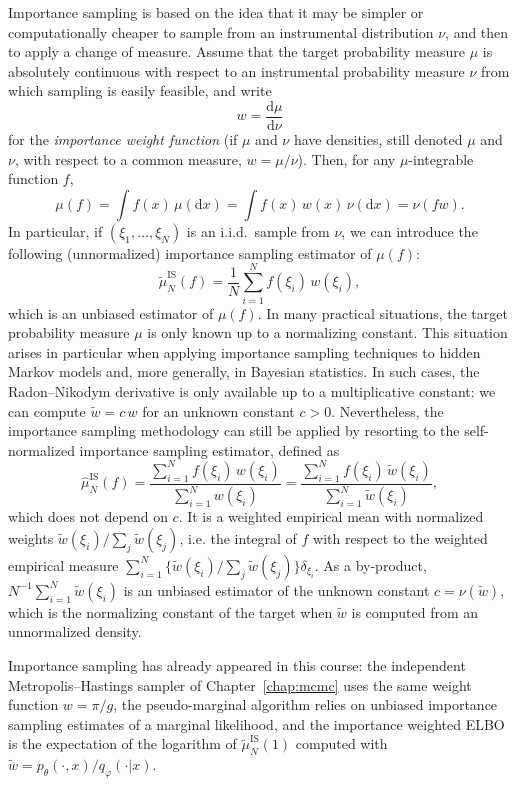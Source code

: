 \documentclass[english,graybox,envcountchap,envcountsame,sectrefs,shortlabels]{svmono}
\theoremstyle{style}
\newcommand{\eqsp}{}
\begin{document}
Importance sampling is based on the idea that it may be simpler or computationally cheaper to sample from an instrumental distribution $\nu$, and then to apply a change of measure. Assume that the target
probability measure $\mu$ is absolutely continuous with respect to an instrumental
probability measure $\nu$ from which sampling is easily feasible, and write
$$
w = \frac{\mathrm{d}\mu}{\mathrm{d}\nu}
$$
for the \emph{importance weight function} (if $\mu$ and $\nu$ have densities, still denoted $\mu$ and $\nu$, with respect to a common measure, $w = \mu/\nu$). Then, for any $\mu$-integrable function $f$,
\[
\mu(f)
= \int f(x)\,\mu(\mathrm{d}x)
= \int f(x)\,w(x)\,\nu(\mathrm{d}x) = \nu(fw)\eqsp.
\]
In particular, if $(\xi_1, \ldots, \xi_N)$ is an i.i.d.\ sample from $\nu$, we can introduce the following (unnormalized) importance sampling estimator of $\mu(f)$:
\[
\tilde{\mu}^{\mathrm{IS}}_{N}(f)
= \frac{1}{N}\sum_{i=1}^N
f(\xi_i)\,w(\xi_i)\eqsp,
\]
which is an unbiased estimator of $\mu(f)$.
In many practical situations, the target probability measure $\mu$ is only known up to a normalizing
constant. This situation arises in particular
when applying importance sampling techniques to hidden Markov models and,
more generally, in Bayesian statistics. In such cases, the Radon--Nikodym
derivative is only available up to a multiplicative
constant: we can compute $\tilde w = c\, w$ for an unknown constant $c>0$. Nevertheless, the importance sampling methodology can still be applied by
resorting to the self-normalized importance sampling estimator, defined as
\[
\hat{\mu}^{\mathrm{IS}}_{N}(f)
=
\frac{\sum_{i=1}^N f(\xi_i)\,
w(\xi_i)}
{\sum_{i=1}^N
w(\xi_i)} = \frac{\sum_{i=1}^N f(\xi_i)\,
\tilde w(\xi_i)}
{\sum_{i=1}^N
\tilde w(\xi_i)}\eqsp,
\]
which does not depend on $c$. It is a weighted empirical mean with normalized weights $\tilde w(\xi_i)/\sum_{j}\tilde w(\xi_j)$, i.e. the integral of $f$ with respect to the weighted empirical measure $\sum_{i=1}^N \{\tilde w(\xi_i)/\sum_{j}\tilde w(\xi_j)\}\delta_{\xi_i}$. As a by-product, $N^{-1}\sum_{i=1}^N\tilde w(\xi_i)$ is an unbiased estimator of the unknown constant $c = \nu(\tilde w)$, which is the normalizing constant of the target when $\tilde w$ is computed from an unnormalized density.

\begin{remark}
Importance sampling has already appeared in this course: the independent Metropolis--Hastings sampler of Chapter~\ref{chap:mcmc} uses the same weight function $w=\pi/g$, the pseudo-marginal algorithm relies on unbiased importance sampling estimates of a marginal likelihood, and the importance weighted ELBO  is the expectation of the logarithm of $\tilde\mu^{\mathrm{IS}}_N(1)$ computed with $\tilde w = p_\theta(\cdot,x)/q_\varphi(\cdot|x)$.
\end{remark}
\end{document}
